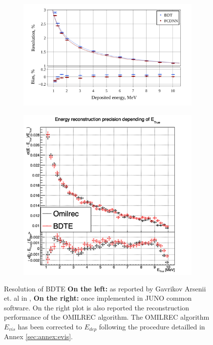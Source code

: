\documentclass[../main.tex]{subfiles}
\begin{document}
\begin{figure}[ht]
  \centering
  \begin{subfigure}[t]{0.58\linewidth}
    \includegraphics[width=\linewidth]{images/janne/bdte/bdte_perf.png}
    \caption{}
    \label{fig:janne:bdte:orignal_perf}
  \end{subfigure}
  \hfill
  \begin{subfigure}[t]{0.38\linewidth}
    \includegraphics[width=\linewidth]{images/janne/bdte/e_rec_vs_e_true.png}
    \caption{}
    \label{fig:janne:bdte:implementation_perf}
  \end{subfigure}
  \caption{Resolution of BDTE \textbf{On the left: } as reported by Gavrikov Arsenii et. al in \cite{gavrikov_energy_2022}, \textbf{On the right: } once implemented in JUNO common software. On the right plot is also reported the reconstruction performance of the OMILREC algorithm. The OMILREC algorithm $E_{vis}$ has been corrected to $E_{dep}$ following the procedure detailled in Annex \ref{sec:annex:evis}.}
  \label{fig:janne:bdte:perf}
\end{figure}
\end{document}
